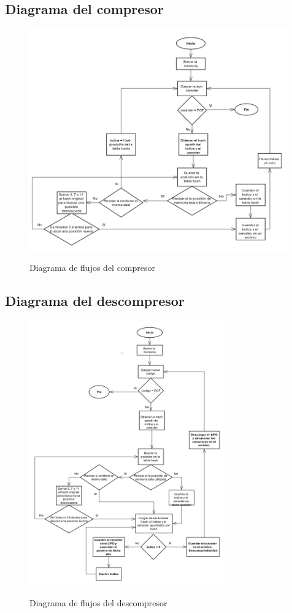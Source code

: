 \documentclass[letterpaper]{article}
\begin{document}
\subsection{Diagrama del compresor}

\begin{figure}[h!]
	\centering
	\includegraphics[width=0.99\textwidth]{compresorpng.png}
	\label{fig2}
	\caption{Diagrama de flujos del compresor}
\end{figure}

\pagebreak

\subsection{Diagrama del descompresor}


\begin{figure}[h!]
	\centering
	\includegraphics[width=0.75\textwidth]{descompresor.png}
	\label{fig2}
	\caption{Diagrama de flujos del descompresor}
\end{figure}
\end{document}
